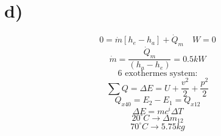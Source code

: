 

\section*{d)}
\[
0 = \dot{m} \left[ h_e - h_a \right] + \dot{Q}_m \quad W = 0
\]
\[
\dot{m} = \frac{\dot{Q}_m}{(h_a - h_e)} = 0.5 kW
\]
\[
\text{6 exothermes system:}
\]
\[
\sum Q = \Delta E = U + \frac{v^2}{2} + \frac{p^2}{2}
\]
\[
Q_{x40} = E_2 - E_1 = Q_{x12}
\]
\[
\Delta E = mc^i \Delta T
\]
\[
20^\circ C \rightarrow \Delta m_{12}
\]
\[
70^\circ C \rightarrow 5.75 kg
\]